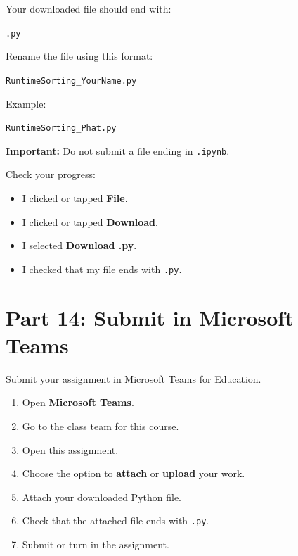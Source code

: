 \documentclass[11pt]{article}
\newcommand{\checkbox}{$\square$}
\begin{document}
\noindent
Your downloaded file should end with:

\begin{center}
\texttt{.py}
\end{center}

\noindent
Rename the file using this format:

\begin{center}
\texttt{RuntimeSorting\_YourName.py}
\end{center}

\noindent
Example:

\begin{center}
\texttt{RuntimeSorting\_Phat.py}
\end{center}

\noindent
\textbf{Important:} Do not submit a file ending in \texttt{.ipynb}.

\noindent Check your progress:

\begin{itemize}
    \item[\checkbox] I clicked or tapped \textbf{File}.
    \item[\checkbox] I clicked or tapped \textbf{Download}.
    \item[\checkbox] I selected \textbf{Download .py}.
    \item[\checkbox] I checked that my file ends with \texttt{.py}.
\end{itemize}

\section*{Part 14: Submit in Microsoft Teams}

Submit your assignment in Microsoft Teams for Education.

\begin{enumerate}
    \item Open \textbf{Microsoft Teams}.
    \item Go to the class team for this course.
    \item Open this assignment.
    \item Choose the option to \textbf{attach} or \textbf{upload} your work.
    \item Attach your downloaded Python file.
    \item Check that the attached file ends with \texttt{.py}.
    \item Submit or turn in the assignment.
\end{enumerate}
\end{document}
